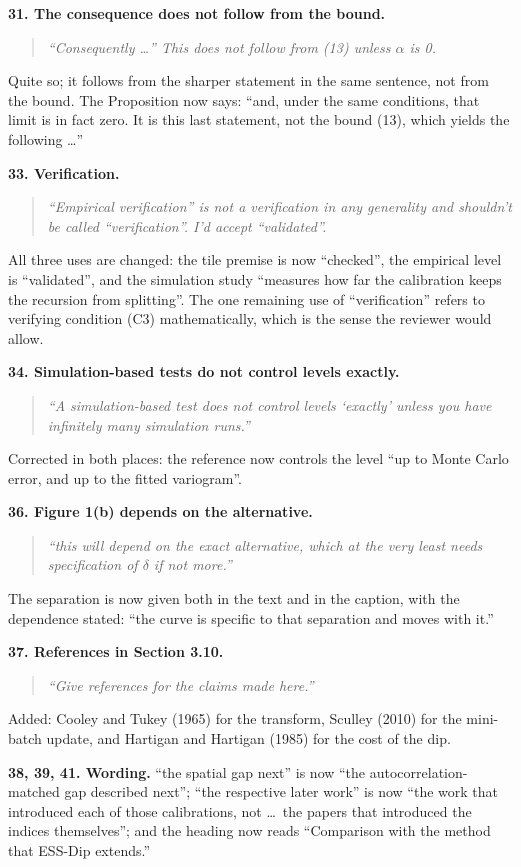\documentclass[11pt]{article}
\newcommand{\R}[1]{\medskip\noindent\textbf{#1}\quad}
\newenvironment{rquote}{\begin{quote}\itshape}{\end{quote}}
\begin{document}
\R{31. The consequence does not follow from the bound.}
\begin{rquote}
``Consequently \dots'' This does not follow from (13) unless $\alpha$ is 0.
\end{rquote}
Quite so; it follows from the sharper statement in the same sentence, not from
the bound. The Proposition now says: ``and, under the same conditions, that
limit is in fact zero. It is this last statement, not the bound (13), which
yields the following \dots''

\R{33. Verification.}
\begin{rquote}
``Empirical verification'' is not a verification in any generality and
shouldn't be called ``verification''. I'd accept ``validated''.
\end{rquote}
All three uses are changed: the tile premise is now ``checked'', the empirical
level is ``validated'', and the simulation study ``measures how far the
calibration keeps the recursion from splitting''. The one remaining use of
``verification'' refers to verifying condition (C3) mathematically, which is
the sense the reviewer would allow.

\R{34. Simulation-based tests do not control levels exactly.}
\begin{rquote}
``A simulation-based test does not control levels `exactly' unless you have
infinitely many simulation runs.''
\end{rquote}
Corrected in both places: the reference now controls the level ``up to Monte
Carlo error, and up to the fitted variogram''.

\R{36. Figure 1(b) depends on the alternative.}
\begin{rquote}
``this will depend on the exact alternative, which at the very least needs
specification of $\delta$ if not more.''
\end{rquote}
The separation is now given both in the text and in the caption, with the
dependence stated: ``the curve is specific to that separation and moves with
it.''

\R{37. References in Section 3.10.}
\begin{rquote}
``Give references for the claims made here.''
\end{rquote}
Added: Cooley and Tukey (1965) for the transform, Sculley (2010) for the
mini-batch update, and Hartigan and Hartigan (1985) for the cost of the dip.

\R{38, 39, 41. Wording.}
``the spatial gap next'' is now ``the autocorrelation-matched gap described
next''; ``the respective later work'' is now ``the work that introduced each of
those calibrations, not \dots\ the papers that introduced the indices
themselves''; and the heading now reads ``Comparison with the method that
ESS-Dip extends.''
\end{document}
